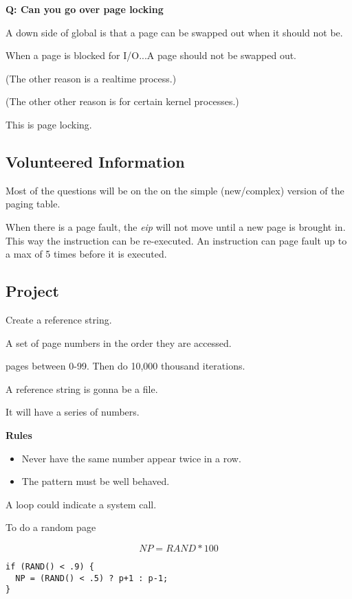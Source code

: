 \documentclass{article}
\begin{document}
{\bf Q: Can you go over page locking}

A down side of global is that a page can be swapped out when it should not be.

When a page is blocked for I/O...A page should not be swapped out.

(The other reason is a realtime process.)

(The other other reason is for certain kernel processes.)

This is page locking.

{\bf }



\subsection*{Volunteered Information}

Most of the questions will be on the on the simple (new/complex) version of the paging table.

When there is a page fault, the {\it eip} will not move until a new page is brought in. 
This way the instruction can be re-executed.
An instruction can page fault up to a max of 5 times before it is executed.

\subsection{Project}

Create a reference string.

A set of page numbers in the order they are accessed.

pages between 0-99.
Then do 10,000 thousand iterations.

A reference string is gonna be a file.

It will have a series of numbers.

{\bf Rules}
\begin{itemize}
\item Never have the same number appear twice in a row.
\item The pattern must be well behaved.
\end{itemize}

A loop could indicate a system call.

To do a random page

$$
NP = RAND*100
$$

\begin{verbatim}
if (RAND() < .9) {
  NP = (RAND() < .5) ? p+1 : p-1;
}
\end{verbatim}
\end{document}
